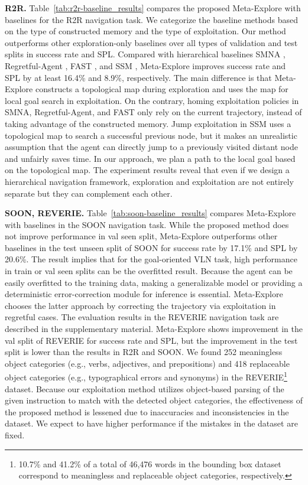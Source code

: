 \documentclass[10pt,twocolumn,letterpaper]{article}
\begin{document}
\noindent\textbf{R2R.}
Table~\ref{tab:r2r-baseline_results} compares the proposed Meta-Explore with baselines for the R2R navigation task. We categorize the baseline methods based on the type of constructed memory and the type of exploitation. Our method outperforms other exploration-only baselines over all types of validation and test splits in success rate and SPL. Compared with hierarchical baselines SMNA \cite{ma2019self}, Regretful-Agent \cite{ma2019regretful}, FAST \cite{ke2019tactical}, and SSM \cite{Wang_2021_CVPR-structured-scene}, Meta-Explore improves success rate and SPL by at least 16.4\% and 8.9\%, respectively. The main difference is that Meta-Explore constructs a topological map during exploration and uses the map for local goal search in exploitation. On the contrary, homing exploitation policies in SMNA, Regretful-Agent, and FAST only rely on the current trajectory, instead of taking advantage of the constructed memory. Jump exploitation in SSM uses a topological map to search a successful previous node, but it makes an unrealistic assumption that the agent can directly jump to a previously visited distant node and unfairly saves time. In our approach, we plan a path to the local goal based on the topological map. The experiment results reveal that even if we design a hierarchical navigation framework, exploration and exploitation are not entirely separate but they can complement each other.

\noindent\textbf{SOON, REVERIE.}
Table~\ref{tab:soon-baseline_results} compares Meta-Explore with baselines in the SOON navigation task. While the proposed method does not improve performance in val seen split, Meta-Explore outperforms other baselines in the test unseen split of SOON for success rate by 17.1\% and SPL by 20.6\%. The result implies that for the goal-oriented VLN task, high performance in train or val seen splits can be the overfitted result. Because the agent can be easily overfitted to the training data, making a generalizable model or providing a deterministic error-correction module for inference is essential. Meta-Explore chooses the latter approach by correcting the trajectory via exploitation in regretful cases. The evaluation results in the REVERIE navigation task are described in the supplementary material. Meta-Explore shows improvement in the val split of REVERIE for success rate and SPL, but the improvement in the test split is lower than the results in R2R and SOON. We found 252 meaningless object categories (e.g., verbs, adjectives, and prepositions) and 418 replaceable object categories (e.g., typographical errors and synonyms) in the REVERIE\footnote{10.7\% and 41.2\% of a total of 46,476 words in the bounding box dataset correspond to meaningless and replaceable object categories, respectively.} dataset. Because our exploitation method utilizes object-based parsing of the given instruction to match with the detected object categories, the effectiveness of the proposed method is lessened due to inaccuracies and inconsistencies in the dataset. We expect to have higher performance if the mistakes in the dataset are fixed.
\vspace{-0.2cm}
\end{document}
